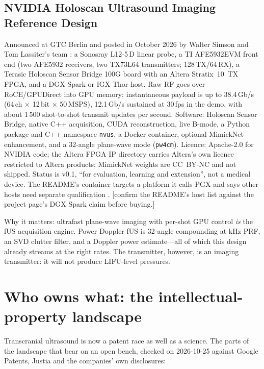 \documentclass[11pt,a4paper]{article}
\newcommand{\todo}[1]{\textcolor{red!70!black}{[#1]}}
\begin{document}
\subsection{NVIDIA Holoscan Ultrasound Imaging Reference Design}

Announced at GTC Berlin and posted in October 2026 by Walter Simson and Tom Lassiter's team \cite{simson2026,holoscan}: a Sonosray L12-5\,D linear probe, a TI AFE5932EVM front end (two AFE5932 receivers, two TX73L64 transmitters; 128\,TX/64\,RX), a Terasic Holoscan Sensor Bridge 100G board with an Altera Stratix~10~TX FPGA, and a DGX Spark or IGX Thor host. Raw RF goes over RoCE/GPUDirect into GPU memory; instantaneous payload is up to 38.4\,Gb/s (64\,ch $\times$ 12\,bit $\times$ 50\,MSPS), 12.1\,Gb/s sustained at 30\,fps in the demo, with about 1\,500 shot-to-shot transmit updates per second. Software: Holoscan Sensor Bridge, native C++ acquisition, CUDA reconstruction, live B-mode, a Python package and C++ namespace \texttt{nvus}, a Docker container, optional MimickNet enhancement, and a 32-angle plane-wave mode (\texttt{pw4cm}). Licence: Apache-2.0 for NVIDIA code; the Altera FPGA IP directory carries Altera's own licence restricted to Altera products; MimickNet weights are CC~BY-NC and not shipped. Status is v0.1, ``for evaluation, learning and extension'', not a medical device. The README's container targets a platform it calls PGX and says other hosts need separate qualification \cite{holoscan}. \todo{confirm the README's host list against the project page's DGX Spark claim before buying.}

Why it matters: ultrafast plane-wave imaging with per-shot GPU control \emph{is} the fUS acquisition engine. Power Doppler fUS is 32-angle compounding at kHz PRF, an SVD clutter filter, and a Doppler power estimate---all of which this design already streams at the right rates. The transmitter, however, is an imaging transmitter: it will not produce LIFU-level pressures.

\section{Who owns what: the intellectual-property landscape}\label{sec:ip}

Transcranial ultrasound is now a patent race as well as a science. The parts of the landscape that bear on an open bench, checked on 2026-10-25 against Google Patents, Justia and the companies' own disclosures:
\end{document}
